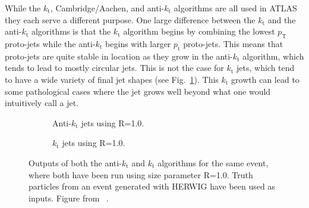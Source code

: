 While the $k_{\mathrm{t}}$, Cambridge/Aachen, and anti-$k_{\mathrm t}$ algorithms are all used in ATLAS they each serve a different purpose. 
One large difference between the $k_{\mathrm t}$ and the anti-$k_{\mathrm t}$ algorithms is that the $k_{\mathrm t}$ algorithm begins by combining the lowest $p_{\mathrm T}$ proto-jets while the anti-$k_{\mathrm t}$ begins with larger $p_{\mathrm t}$ proto-jets.  
This means that proto-jets are quite stable in location as they grow in the anti-$k_{\mathrm t}$ algorithm, which tends to lead to mostly circular jets.  
This is not the case for $k_{\mathrm t}$ jets, which tend to have a wide variety of final jet shapes (see Fig.~\ref{Fig:ExampleJets}).  
This $k_{\mathrm t}$ growth can lead to some pathological cases where the jet grows well beyond what one would intuitively call a jet.  

\begin{figure}[!ht]
 \centering
 \begin{subfigure}{.5\textwidth}
  \centering
  \caption{Anti-$k_{\mathrm t}$ jets using R=1.0.}
 \end{subfigure}%
 \begin{subfigure}{.5\textwidth}
  \centering
  \caption{$k_{\mathrm t}$ jets using R=1.0.}
 \end{subfigure}
 \caption[Comparing differnet jet building algorithms.]
  {Outputs of both the anti-$k_{\mathrm t}$ and $k_{\mathrm t}$ algorithms for the same event, where both have been run using size parameter R=1.0.  Truth particles from an event generated with HERWIG have been used as inputs.  Figure from ~\cite{Cacciari:2008gp}. }

 \label{Fig:ExampleJets}
\end{figure}



